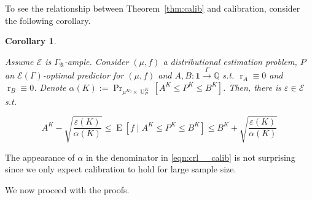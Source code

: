 \documentclass{article}
\numberwithin{equation}{section}
\theoremstyle{definition}
\theoremstyle{plain}
\newtheorem{corollary}{Corollary}[section]
\DeclareMathOperator{\Prb}{Pr}
\DeclareMathOperator{\E}{E}
\DeclareMathOperator{\R}{r}
\DeclareMathOperator{\Un}{U}
\newcommand{\Rats}{\mathbb{Q}}
\newcommand{\GrowA}{\Gamma_{\mathfrak{A}}}
\newcommand{\Fall}{\mathcal{E}}
\newcommand{\EG}{\Fall(\Gamma)}
\newcommand{\Scheme}{\xrightarrow{\Gamma}}
\begin{document}
To see the relationship between Theorem~\ref{thm:calib} and calibration, consider the following corollary.

\begin{corollary}
\label{crl:calib}

Assume $\Fall$ is $\GrowA$-ample. Consider $(\mu,f)$ a distributional estimation problem, $P$ an $\EG$-optimal predictor for $(\mu,f)$ and $A,B: \bm{1} \Scheme \Rats$ s.t. $\R_A \equiv 0$ and $\R_B \equiv 0$. Denote ${\alpha(K):=\Prb_{\mu^{K_0} \times \Un_P^{K}}[A^{K} \leq P^{K} \leq B^{K}]}$. Then, there is $\varepsilon \in \Fall$ s.t. 

\begin{equation}
\label{eqn:crl__calib}
A^{K} - \sqrt{\frac{\varepsilon(K)}{\alpha(K)}} \leq \E[f \mid A^{K} \leq P^{K} \leq B^{K}] \leq B^{K} + \sqrt{\frac{\varepsilon(K)}{\alpha(K)}}
\end{equation}

\end{corollary}

The appearance of $\alpha$ in the denominator in \ref{eqn:crl__calib} is not surprising since we only expect calibration to hold for large sample size.

We now proceed with the proofs.
\end{document}
